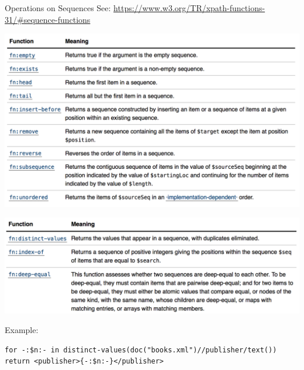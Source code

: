 \begin{frame}[fragile]{Operations on Sequences}
See: \url{https://www.w3.org/TR/xpath-functions-31/#sequence-functions}

\includegraphics[width=\textwidth]{figures/XQuery_sequence_functions1.png}

\end{frame}

\begin{frame}[fragile]
\includegraphics[width=\textwidth]{figures/XQuery_sequence_functions2.png}

Example:

\begin{lstlisting}[style=XQuery]
for -:$n:- in distinct-values(doc("books.xml")//publisher/text())
return <publisher>{-:$n:-}</publisher>
\end{lstlisting}

\end{frame}


